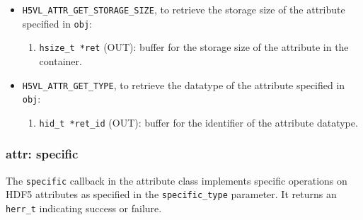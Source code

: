 \begin{itemize}
\item \texttt{H5VL\_ATTR\_GET\_STORAGE\_SIZE}, to retrieve the storage
  size of the attribute specified in \texttt{obj}:
  \begin{enumerate}
  \item \texttt{hsize\_t *ret} (OUT): buffer for the storage size of
    the attribute in the container.
  \end{enumerate}

\item \texttt{H5VL\_ATTR\_GET\_TYPE}, to retrieve the datatype of the
  attribute specified in \texttt{obj}:
  \begin{enumerate}
  \item \texttt{hid\_t *ret\_id} (OUT): buffer for the identifier of the
    attribute datatype.
  \end{enumerate}
  
\end{itemize}

\subsubsection{attr: specific}
The \texttt{specific} callback in the attribute class implements specific operations on HDF5 attributes as specified in the \texttt{specific\_type} parameter. It returns an \texttt{herr\_t} indicating success or failure.\bigskip

